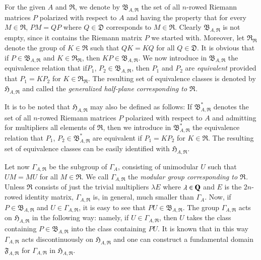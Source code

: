 For the given $A$ and $\mathfrak{R}$, we denote by
$\mathfrak{B}_{A,\mathfrak{R}}$ the set of all $n$-rowed Riemann
matrices $P$ polarized with respect to $A$ and having the property
that for every $M\in\mathfrak{R}$, $PM=QP$ where $Q\in\mathfrak{D}$
corresponds to $M\in\mathfrak{R}$. Clearly
$\mathfrak{B}_{A,\mathfrak{R}}$ is not empty, since it contains the
Riemann matrix $P$ we started with. Moreover, let
$\mathfrak{R}_{\mathfrak{R}}$ denote the group of $K\in\mathfrak{R}$
such that $QK=KQ$ for all $Q\in\mathfrak{D}$. It is obvious that if
$P\in\mathfrak{B}_{A,\mathfrak{R}}$ and
$K\in\mathfrak{R}_{\mathfrak{R}}$, then
$KP\in\mathfrak{B}_{A,\mathfrak{R}}$. We now introduce in
$\mathfrak{B}_{A,\mathfrak{R}}$ the equivalence relation that 
if\pageoriginale $P_{1}$, $P_{2}\in\mathfrak{B}_{A,\mathfrak{R}}$,
then $P_{1}$ and $P_{2}$ are {\em equivalent} provided that
$P_{1}=KP_{2}$ for $K\in\mathfrak{R}_{\mathfrak{R}}$. The resulting
set of equivalence classes is denoted by
$\mathfrak{H}_{A,\mathfrak{R}}$ and called the {\em generalized
  half-plane corresponding to $\mathfrak{R}$.}

It is to be noted that $\mathfrak{H}_{A,\mathfrak{R}}$ may also be
defined as follows: If $\mathfrak{B}^{\ast}_{A,\mathfrak{R}}$ denotes
the set of all $n$-rowed Riemann matrices $P$ polarized with respect
to $A$ and admitting for multipliers all elements of $\mathfrak{R}$,
then we introduce in $\mathfrak{B}^{\ast}_{A,\mathfrak{R}}$ the
equivalence relation that $P_{1}$,
$P_{2}\in\mathfrak{B}^{\ast}_{A,\mathfrak{R}}$ are equivalent if
$P_{1}=KP_{2}$ for $K\in\mathfrak{R}$. The resulting set of
equivalence classes can be easily identified with
$\mathfrak{H}_{A,\mathfrak{R}}$.

Let now $\Gamma_{A,\mathfrak{R}}$ be the subgroup of $\Gamma_{A}$,
consisting of unimodular $U$ such that $UM=MU$ for all
$M\in\mathfrak{R}$. We call $\Gamma_{A,\mathfrak{R}}$ the {\em modular
  group corresponding to $\mathfrak{R}$.} Unless $\mathfrak{R}$
consists of just the trivial multipliers $\lambda E$ where
$\lambda\in\mathbf{Q}$ and $E$ is the $2n$-rowed identity matrix,
$\Gamma_{A,\mathfrak{R}}$ is, in general, much smaller than
$\Gamma_{A}$. Now, if $P\in\mathfrak{B}_{A,\mathfrak{R}}$ and
$U\in\Gamma_{A,\mathfrak{R}}$, it is easy to see that
$PU\in\mathfrak{B}_{A,\mathfrak{R}}$. The group
$\Gamma_{A,\mathfrak{R}}$ acts on $\mathfrak{H}_{A,\mathfrak{R}}$ in
the following way: namely, if $U\in\Gamma_{A,\mathfrak{R}}$, then $U$
takes the class containing $P\in\mathfrak{B}_{A,\mathfrak{R}}$ into
the class containing $PU$. It is known that in this way
$\Gamma_{A,\mathfrak{R}}$ acts discontinuously on
$\mathfrak{H}_{A,\mathfrak{R}}$ and one can construct a fundamental
domain $\mathfrak{F}_{A,\mathfrak{R}}$ for $\Gamma_{A,\mathfrak{R}}$
in $\mathfrak{H}_{A,\mathfrak{R}}$.

